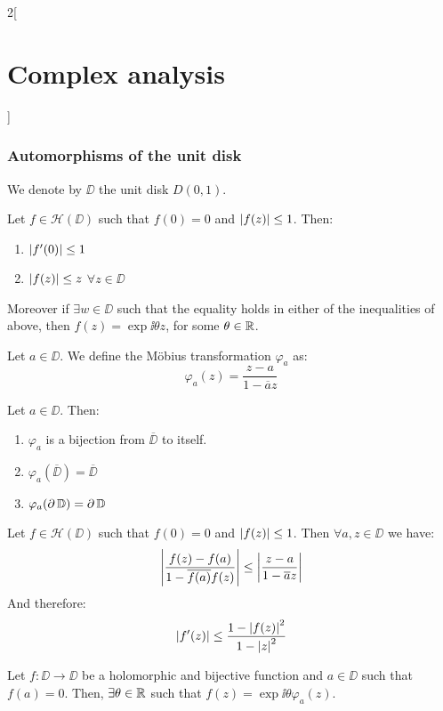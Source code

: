 \documentclass[../../../main.tex]{subfiles}
\begin{document}
\begin{multicols}{2}[\section{Complex analysis}]
  \subsubsection{Automorphisms of the unit disk}
  \begin{definition}
    We denote by $\DD$ the unit disk $D(0,1)$.
  \end{definition}
  \begin{lemma}
    Let $f\in\mathcal{H}(\DD)$ such that $f(0)=0$ and $\abs{f(z)}\leq 1$. Then:
    \begin{enumerate}
      \item $\abs{f'(0)}\leq 1$
      \item $\abs{f(z)}\leq z$ $\forall z\in \DD$
    \end{enumerate}
    Moreover if $\exists w\in \DD$ such that the equality holds in either of the inequalities of above, then $f(z)=\exp{\ii \theta} z$, for some $\theta\in\mathbb{R}$.
  \end{lemma}
  \begin{definition}
    Let $a\in \DD$. We define the Möbius transformation $\varphi_a$ as: $$\varphi_a(z)=\frac{z-a}{1-\overline{a}z}$$
  \end{definition}
  \begin{proposition}
    Let $a\in \DD$. Then:
    \begin{enumerate}
      \item $\varphi_a$ is a bijection from $\overline{\DD}$ to itself.
      \item $\varphi_a(\overline{\DD})=\overline{\DD}$
      \item $\varphi_a(\operatorname{\partial}{\mathbb{D}})=\operatorname{\partial}{\mathbb{D}}$
    \end{enumerate}
  \end{proposition}
  \begin{lemma}
    Let $f\in\mathcal{H}(\DD)$ such that $f(0)=0$ and $\abs{f(z)}\leq 1$. Then $\forall a,z\in \DD$ we have:
    $$\abs{\frac{f(z)-f(a)}{1-\overline{f(a)}f(z)}}\leq\abs{\frac{z-a}{1-\overline{a}z}}$$
    And therefore: $$\abs{f'(z)}\leq\frac{1-{\abs{f(z)}}^2}{1-{\abs{z}}^2}$$
  \end{lemma}
  \begin{theorem}
    Let $f:\DD\rightarrow \DD$ be a holomorphic and bijective function and $a\in \DD$ such that $f(a)=0$. Then, $\exists\theta\in\mathbb{R}$ such that $f(z)=\exp{\ii \theta} \varphi_a(z)$.
  \end{theorem}

\end{multicols}
\end{document}
